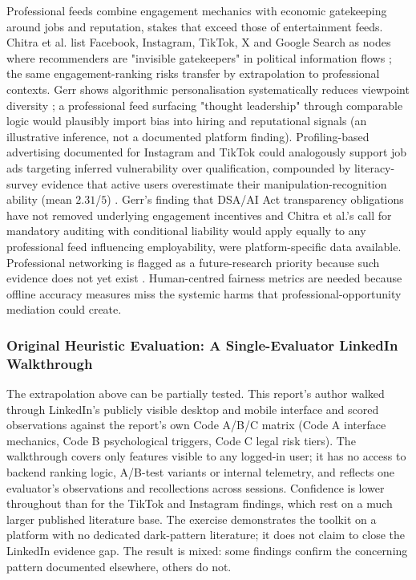 \documentclass[11pt]{article}
\begin{document}
Professional feeds combine engagement mechanics with economic gatekeeping around jobs and reputation, stakes that exceed those of entertainment feeds. Chitra et al. list Facebook, Instagram, TikTok, X and Google Search as nodes where recommenders are "invisible gatekeepers" in political information flows \parencites[2]{6502223}; the same engagement-ranking risks transfer by extrapolation to professional contexts. Gerr shows algorithmic personalisation systematically reduces viewpoint diversity \parencites[5]{5142478}[29]{5142478}; a professional feed surfacing "thought leadership" through comparable logic would plausibly import bias into hiring and reputational signals (an illustrative inference, not a documented platform finding). Profiling-based advertising documented for Instagram and TikTok \parencites[4]{6941611} could analogously support job ads targeting inferred vulnerability over qualification, compounded by literacy-survey evidence that active users overestimate their manipulation-recognition ability (mean $2.31$/$5$) \parencites[10]{9360054}. Gerr's finding that DSA/AI Act transparency obligations have not removed underlying engagement incentives \parencites[7]{5142478}[28]{5142478} and Chitra et al.'s call for mandatory auditing with conditional liability \parencites[17]{6502223} would apply equally to any professional feed influencing employability, were platform-specific data available. Professional networking is flagged as a future-research priority because such evidence does not yet exist \parencites[5]{5142478}[2244]{6502223}[25]{2977039}. Human-centred fairness metrics \parencites[53]{4905459} are needed because offline accuracy measures miss the systemic harms that professional-opportunity mediation could create.

\subsubsection{Original Heuristic Evaluation: A Single-Evaluator LinkedIn Walkthrough}
The extrapolation above can be partially tested. This report's author walked through LinkedIn's publicly visible desktop and mobile interface and scored observations against the report's own Code A/B/C matrix (Code A interface mechanics, Code B psychological triggers, Code C legal risk tiers). The walkthrough covers only features visible to any logged-in user; it has no access to backend ranking logic, A/B-test variants or internal telemetry, and reflects one evaluator's observations and recollections across sessions. Confidence is lower throughout than for the TikTok and Instagram findings, which rest on a much larger published literature base. The exercise demonstrates the toolkit on a platform with no dedicated dark-pattern literature; it does not claim to close the LinkedIn evidence gap. The result is mixed: some findings confirm the concerning pattern documented elsewhere, others do not.
\end{document}
